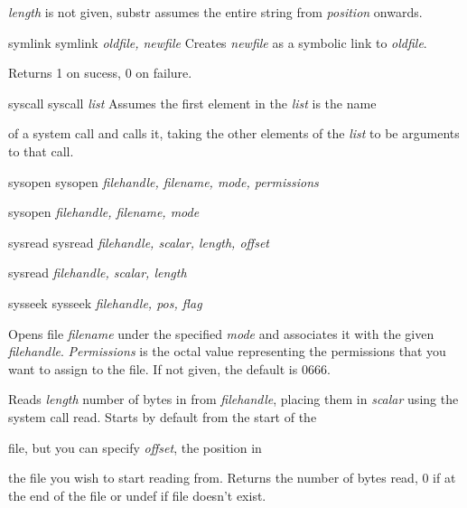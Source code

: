 \documentclass[a4paper,11pt]{book}
\begin{document}
\noindent \textit{length }is not given, substr assumes the entire string from \textit{position }onwards.

\noindent 

\noindent symlink symlink \textit{oldfile, newfile }Creates \textit{newfile }as a symbolic link to \textit{oldfile}.

\noindent Returns 1 on sucess, 0 on failure.

\noindent 

\noindent syscall syscall \textit{list }Assumes the first element in the \textit{list }is the name

\noindent of a system call and calls it, taking the other elements of the \textit{list }to be arguments to that call.

\noindent 

\noindent sysopen sysopen \textit{filehandle, filename, mode, permissions}

\noindent 

\noindent sysopen \textit{filehandle, filename, mode}

\noindent 

\noindent sysread sysread \textit{filehandle, scalar, length, offset}

\noindent 

\noindent sysread \textit{filehandle, scalar, length}

\noindent 

\noindent 

\noindent 

\noindent sysseek sysseek \textit{filehandle, pos, flag}

\noindent 

\noindent Opens file \textit{filename }under the specified \textit{mode }and associates it with the given \textit{filehandle}. \textit{Permissions }is the octal value representing the permissions that you want to assign to the file. If not given, the default is 0666.

\noindent 

\noindent Reads \textit{length }number of bytes in from \textit{filehandle}, placing them in \textit{scalar }using the system call read. Starts by default from the start of the

\noindent file, but you can specify \textit{offset}, the position in

\noindent the file you wish to start reading from. Returns the number of bytes read, 0 if at the end of the file or undef if file doesn't exist.

\noindent 
\end{document}
